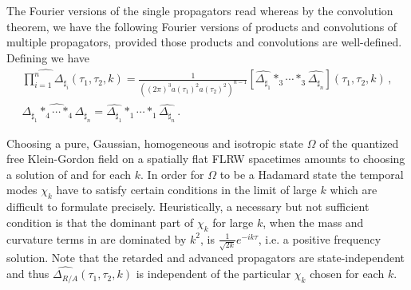 \documentclass[10pt]{book}
\let\int\int
\newcommand{\Mcal}{\mathcal{M}}
\theoremstyle{break}
\begin{document}
The Fourier versions of the single propagators read
whereas by the convolution theorem, we have the following Fourier versions of products and convolutions of multiple propagators, provided those products and convolutions are well-defined. 
Defining
we have
\begin{gather}%
\widehat{\prod^n_{i=1}\Delta_{\sharp_i}}(\tau_1,\tau_2,k)=\frac{1}{\left((2\pi)^3 a(\tau_1)^{2}a(\tau_2)^{2}\right)^{n-1}}\left[\widehat{\Delta_{\sharp_1}}\ast_3\cdots\ast_3\widehat{\Delta_{\sharp_n}}\right](\tau_1,\tau_2,k)\,,\\
\widehat{\Delta_{\sharp_1}\ast_4\cdots\ast_4\Delta_{\sharp_n}}=\widehat{\Delta_{\sharp_1}}\ast_1\cdots\ast_1
\widehat{\Delta_{\sharp_n}}\,.
\end{gather}

Choosing a pure, Gaussian, homogeneous and isotropic state $\Omega$ of the quantized free Klein-Gordon field on a spatially flat FLRW spacetimes amounts to choosing a solution of %
and %
for each $k$. In order for $\Omega$ to be a Hadamard state the temporal modes $\chi_k$ have to satisfy certain conditions in the limit of large $k$ which are difficult to formulate precisely. Heuristically, a necessary but not sufficient condition is that the dominant part of $\chi_k$ for large $k$, when the mass and curvature terms in %
are dominated by $k^2$, is $\frac{1}{\sqrt{2k}}e^{-ik\tau}$, i.e. a positive frequency solution. Note that the retarded and advanced propagators are state-independent and thus $\widehat{\Delta_{R/A}}(\tau_1,\tau_2,k)$ is independent of the particular $\chi_k$ chosen for each $k$.
\end{document}
